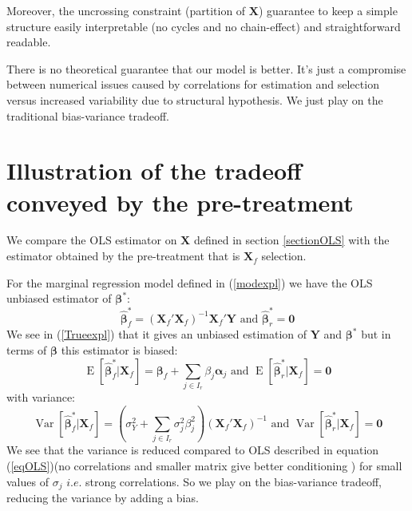 \documentclass[11pt,a4paper]{report}
\begin{document}
Moreover, the uncrossing constraint (partition of $\boldsymbol{X}$) guarantee to keep a simple structure easily interpretable (no cycles and no chain-effect) and straightforward readable.

	
			There is no theoretical guarantee that our model is better. It's just a compromise between numerical issues caused by correlations for estimation and selection versus increased variability due to structural hypothesis. We just play on the traditional bias-variance tradeoff.
			 
	\section{Illustration of the tradeoff conveyed by the pre-treatment}	
	We compare the OLS estimator on $\boldsymbol{X}$ defined in section \ref{sectionOLS} with the estimator obtained by the pre-treatment that is $\boldsymbol{X}_f$ selection.
  
For the marginal regression model defined in (\ref{modexpl})
we have the \textsc{OLS} unbiased estimator of $\boldsymbol{\beta}^*$: 
		\begin{equation}
			\hat{\boldsymbol{\beta}}_f^* = (\boldsymbol{X}_f'\boldsymbol{X}_f)^{-1}\boldsymbol{X}_f'\boldsymbol{Y}  \textrm{ and }\boldsymbol{\hat\beta}_r^* = \boldsymbol{0}
		\end{equation}
		We see in (\ref{Trueexpl}) that it gives an unbiased estimation of $\boldsymbol{Y}$ and $\boldsymbol{\beta^*}$
		but in terms of $\boldsymbol{\beta}$ this estimator is biased:
		\begin{equation}
			\operatorname{E}[\hat{\boldsymbol{\beta}}_f^*|\boldsymbol{X}_f]=\boldsymbol{\beta}_f+\sum_{j \in I_r}\beta_{j}\boldsymbol{\alpha}_j \textrm{ and }\operatorname{E}[\hat{\boldsymbol{\beta}}_r^*|\boldsymbol{X}_f]=\boldsymbol{0}
		\end{equation}
		with variance:
		\begin{equation}
			\operatorname{Var}[\hat{\boldsymbol{\beta}}_f^*|\boldsymbol{X}_f]= (\sigma^2_Y+\sum_{j \in I_r}\sigma^2_{j}\beta_{j}^2 )(\boldsymbol{X}_f' \boldsymbol{X}_f)^{-1}  \textrm{ and }\operatorname{Var}[\hat{\boldsymbol{\beta}}_r^*|\boldsymbol{X}_f]= \boldsymbol{0} 
		\end{equation}
		We see that the variance is reduced compared to OLS described in equation (\ref{eqOLS})(no correlations and smaller matrix give better conditioning ) for small values of $\sigma_j$ $i.e.$ strong correlations. So we play on the bias-variance tradeoff, reducing the variance by adding a bias. 				  
		  
\end{document}
